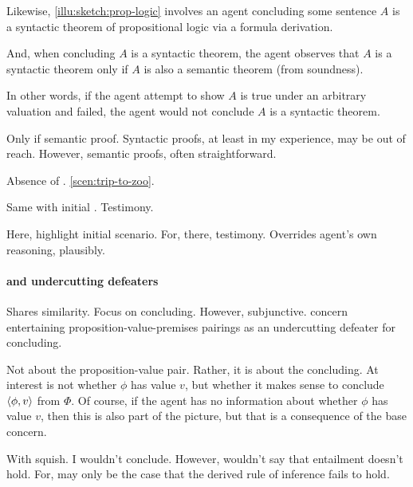 \begin{note}
  Likewise, \autoref{illu:sketch:prop-logic} involves an agent concluding some sentence \(A\) is a syntactic theorem of propositional logic via a formula derivation.

  And, when concluding \(A\) is a syntactic theorem, the agent observes that \(A\) is a syntactic theorem only if \(A\) is also a semantic theorem (from soundness).

  In other words, if the agent attempt to show \(A\) is true under an arbitrary valuation and failed, the agent would not conclude \(A\) is a syntactic theorem.

  Only if semantic proof.
  Syntactic proofs, at least in my experience, may be out of reach.
  However, semantic proofs, often straightforward.
\end{note}

\begin{note}
  Absence of \requ{}.
  \autoref{scen:trip-to-zoo}.

  Same with initial .
  Testimony.
\end{note}

\begin{note}
  Here, highlight initial scenario.
  For, there, testimony.
  Overrides agent's own reasoning, plausibly.
\end{note}

\paragraph{ and undercutting defeaters}

\begin{note}
  Shares similarity.
  Focus on concluding.
  However, subjunctive.
   concern entertaining proposition-value-premises pairings as an undercutting defeater for concluding.
\end{note}

\begin{note}
  Not about the proposition-value pair.
  Rather, it is about the concluding.
  At interest is not whether \(\phi\) has value \(v\), but whether it makes sense to conclude \(\langle \phi, v \rangle\) from \(\Phi\).
  Of course, if the agent has no information about whether \(\phi\) has value \(v\), then this is also part of the picture, but that is a consequence of the base concern.

  With squish.
  I wouldn't conclude.
  However, wouldn't say that entailment doesn't hold.
  For, may only be the case that the derived rule of inference fails to hold.
\end{note}

